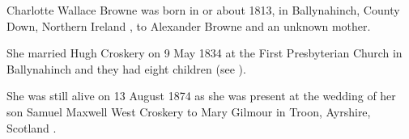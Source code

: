 
Charlotte Wallace Browne was born in or about 1813, in Ballynahinch, County Down, Northern Ireland \cite{CharlotteWBrowneBirth}, to Alexander Browne and an unknown mother.

She married Hugh Croskery on 9 May 1834 at the First Presbyterian Church in Ballynahinch and they had eight children (see ).

She was still alive on 13 August 1874 as she was present at the wedding of her son Samuel Maxwell West Croskery to Mary Gilmour in Troon, Ayrshire, Scotland \cite{CharlotteWBrowne}.

